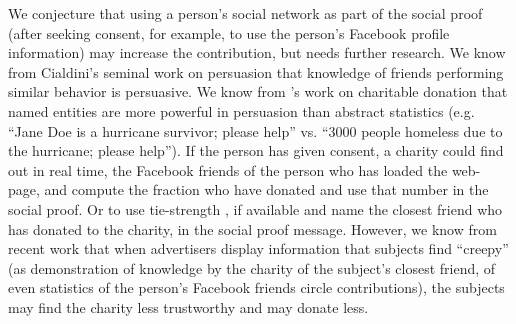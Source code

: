 \begin{description} [leftmargin=\parindent,topsep=0pt,partopsep=3pt,parsep=0pt,itemsep=3pt, listparindent=\parindent]
    We conjecture that using a person's social network as part of the social proof (after seeking consent, for example, to use the person's Facebook profile information) may increase the contribution, but needs further research. We know from Cialdini's seminal work on persuasion that knowledge of friends performing similar behavior is persuasive. We know from \textcite{small2007sympathy}'s work on charitable donation that named entities are more powerful in persuasion than abstract statistics (e.g. ``Jane Doe is a hurricane survivor; please help'' vs. ``3000 people homeless due to the hurricane; please help''). If the person has given consent, a charity could find out in real time, the Facebook friends of the person who has loaded the web-page, and compute the fraction who have donated and use that number in the social proof. Or to use tie-strength \cite{Gilbert}, if available and name the closest friend who has donated to the charity, in the social proof message. However, we know from recent work \cite{eslami2018communicating} that when advertisers display information that subjects find ``creepy'' (as demonstration of knowledge by the charity of the subject's closest friend, of even statistics of the person's Facebook friends circle contributions), the subjects may find the charity less trustworthy and may donate less.
    

\end{description}
